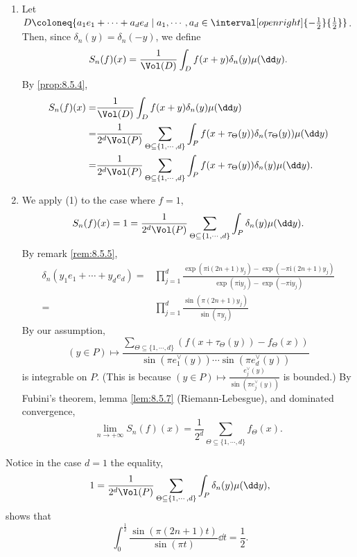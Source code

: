 \begin{proofenv}
    \quad
    \begin{enumerate}[label = (\arabic*)]
        \item Let $D \coloneq \{a_1 e_1 + \cdots + a_d e_d \mid a_1, \cdots, a_d \in \interval[open right]{-\frac{1}{2}}{\frac{1}{2}}\}$.
            Then, since $\delta_{n}(y) = \delta_{n} (-y)$, we define
            $$S_n(f)(x) = \frac{1}{\Vol(D)} \int_{D} f(x + y)\delta_{n}(y) \mu(\dd y).$$
            By \ref{prop:8.5.4},
            $$\begin{aligned}
                S_{n}(f)(x) = & \frac{1}{\Vol(D)} \int_{D} f(x + y) \delta_{n}(y) \mu(\dd y)\\
                = & \frac{1}{2^d \Vol(P)} \sum_{\Theta \subseteq \{1,\cdots,d\}} \int_{P} f(x + \tau_{\Theta}(y)) \delta_{n}(\tau_{\Theta}(y))\mu(\dd y)\\
                = & \frac{1}{2^d \Vol(P)} \sum_{\Theta \subseteq \{1,\cdots,d\}} \int_{P} f(x + \tau_{\Theta}(y)) \delta_{n}(y)\mu(\dd y).
            \end{aligned}$$
        \item We apply (1) to the case where $f = 1$,
            $$S_n(f) (x) = 1 = \frac{1}{2^d \Vol(P)} \sum_{\Theta \subseteq \{1,\cdots,d\}} \int_{P} \delta_{n} (y) \mu(\dd y).$$
            By remark \ref{rem:8.5.5},
            $$\begin{aligned}
                \delta_{n}(y_1 e_1 + \cdots + y_d e_d) = & \prod_{j=1}^{d} \frac{\exp(\pi \mathrm{i} (2n + 1) y_{j}) - \exp(-\pi \mathrm{i} (2n + 1)y_{j})}{\exp(\pi \mathrm{i} y_{j}) - \exp(-\pi \mathrm{i} y_{j})}\\
                = & \prod_{j=1}^{d} \frac{\sin(\pi (2n + 1) y_j)}{\sin (\pi y_j)}
            \end{aligned}$$
            By our assumption,
            $$(y \in P) \longmapsto \frac{\sum_{\Theta \subseteq \{1,\cdots,d\}}(f(x + \tau_{\Theta}(y)) - f_{\Theta}(x))}{\sin(\pi e_1^\vee(y)) \cdots \sin(\pi e_d^\vee(y))}$$
            is integrable on $P$.
            (This is because $(y \in P) \longmapsto \frac{e_j^\vee (y)}{\sin(\pi e_j^\vee(y))}$ is bounded.)
            By Fubini's theorem, lemma \ref{lem:8.5.7} (Riemann-Lebesgue), and dominated convergence,
            $$\lim_{n \to +\infty} S_{n}(f) (x) = \frac{1}{2^d} \sum_{\Theta \subseteq \{1,\cdots,d\}} f_{\Theta}(x).$$
    \end{enumerate}
\end{proofenv}

\begin{remark}\label{rem:8.5.9}
    Notice in the case $d = 1$ the equality,
    $$1 = \frac{1}{2^d \Vol(P)} \sum_{\Theta \subseteq \{1,\cdots,d\}} \int_{P} \delta_{n}(y) \mu(\dd y),$$
    shows that
    $$\int_{0}^{\frac{1}{2}} \frac{\sin(\pi (2n + 1) t)}{\sin(\pi t)} \dd t = \frac{1}{2}.$$
\end{remark}

